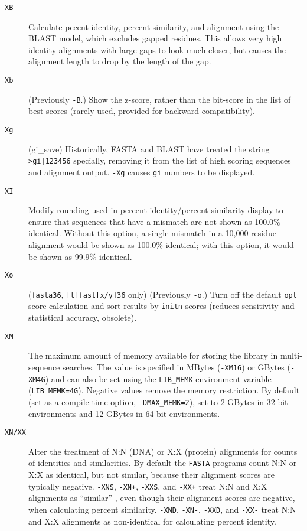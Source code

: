 \documentclass[11pt]{article}
\begin{document}
\begin{description}
\begin{description}
\item[\texttt{XB}] Calculate pecent identity, percent similarity, and
  alignment using the BLAST model, which excludes gapped residues.
  This allows very high identity alignments with large gaps to look
  much closer, but causes the alignment length to drop by the length
  of the gap.

\item[\texttt{Xb}] (Previously \texttt{-B}.)  Show the z-score, rather
  than the bit-score in the list of best scores (rarely used, provided
  for backward compatibility).

\item[\texttt{Xg}] (gi\_save) Historically, FASTA and BLAST have
  treated the string \texttt{>gi|123456} specially, removing it from the list
  of high scoring sequences and alignment output.  \texttt{-Xg}
  causes \texttt{gi} numbers to be displayed.

\item[\texttt{XI}] Modify rounding used in percent identity/percent
  similarity display to ensure that sequences that have a mismatch are
  not shown as 100.0\% identical.  Without this option, a single
  mismatch in a 10,000 residue alignment would be shown as 100.0\%
  identical; with this option, it would be shown as 99.9\%
  identical.

\item[\texttt{Xo}] (\texttt{fasta36}, \texttt{[t]fast[x/y]36} only)
  (Previously \texttt{-o}.) Turn off the default \texttt{opt} score
  calculation and sort results by \texttt{initn} scores (reduces
  sensitivity and statistical accuracy, obsolete).

\item[\texttt{XM}] The maximum amount of memory available for storing
  the library in multi-sequence searches. The value is specified in
  MBytes (\texttt{-XM16}) or GBytes (\texttt{-XM4G}) and can also be
  set using the \texttt{LIB\_MEMK} environment variable
  (\texttt{LIB\_MEMK=4G}).  Negative values remove the memory
  restriction. By default (set as a compile-time option,
  \texttt{-DMAX\_MEMK=2}), set to 2 GBytes in 32-bit environments and
  12 GBytes in 64-bit environments.

\item[\texttt{XN/XX}] Alter the treatment of N:N (DNA) or X:X
  (protein) alignments for counts of identities and similarities. By
  default the \texttt{FASTA} programs count N:N or X:X as identical,
  but not similar, because their alignment scores are typically
  negative. \texttt{-XNS}, \texttt{-XN+}, \texttt{-XXS}, and
  \texttt{-XX+} treat N:N and X:X alignments as ``similar'' , even
  though their alignment scores are negative, when calculating percent
  similarity. \texttt{-XND}, \texttt{-XN-}, \texttt{-XXD}, and
  \texttt{-XX-} treat N:N and X:X alignments as non-identical for
  calculating percent identity.


\end{description}
\end{description}
\end{document}
